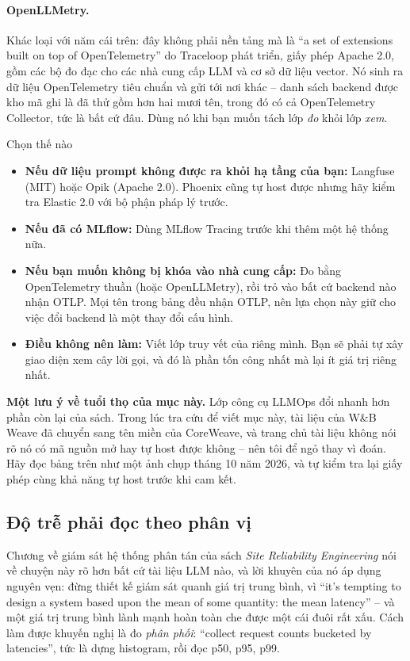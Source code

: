 \paragraph{OpenLLMetry.} Khác loại với năm cái trên: đây không phải nền tảng mà là ``a set of extensions built on top of OpenTelemetry'' do Traceloop phát triển, giấy phép Apache 2.0, gồm các bộ đo đạc cho các nhà cung cấp LLM và cơ sở dữ liệu vector. Nó sinh ra dữ liệu OpenTelemetry tiêu chuẩn và gửi tới nơi khác -- danh sách backend được kho mã ghi là đã thử gồm hơn hai mươi tên, trong đó có cả OpenTelemetry Collector, tức là bất cứ đâu. Dùng nó khi bạn muốn tách lớp \emph{đo} khỏi lớp \emph{xem}.

\begin{assess}{Chọn thế nào}
\begin{itemize}
	\item \textbf{Nếu dữ liệu prompt không được ra khỏi hạ tầng của bạn:} Langfuse (MIT) hoặc Opik (Apache 2.0). Phoenix cũng tự host được nhưng hãy kiểm tra Elastic 2.0 với bộ phận pháp lý trước.
	\item \textbf{Nếu đã có MLflow:} Dùng MLflow Tracing trước khi thêm một hệ thống nữa.
	\item \textbf{Nếu bạn muốn không bị khóa vào nhà cung cấp:} Đo bằng OpenTelemetry thuần (hoặc OpenLLMetry), rồi trỏ vào bất cứ backend nào nhận OTLP. Mọi tên trong bảng đều nhận OTLP, nên lựa chọn này giữ cho việc đổi backend là một thay đổi cấu hình.
	\item \textbf{Điều không nên làm:} Viết lớp truy vết của riêng mình. Bạn sẽ phải tự xây giao diện xem cây lời gọi, và đó là phần tốn công nhất mà lại ít giá trị riêng nhất.
\end{itemize}
\textbf{Một lưu ý về tuổi thọ của mục này.} Lớp công cụ LLMOps đổi nhanh hơn phần còn lại của sách. Trong lúc tra cứu để viết mục này, tài liệu của W\&B Weave đã chuyển sang tên miền của CoreWeave, và trang chủ tài liệu không nói rõ nó có mã nguồn mở hay tự host được không -- nên tôi để ngỏ thay vì đoán. Hãy đọc bảng trên như một ảnh chụp tháng 10 năm 2026, và tự kiểm tra lại giấy phép cùng khả năng tự host trước khi cam kết.
\end{assess}

\subsection{Độ trễ phải đọc theo phân vị}
\label{ssec:latency_percentiles}

Chương về giám sát hệ thống phân tán của sách \textit{Site Reliability Engineering} \cite{beyer2016sre} nói về chuyện này rõ hơn bất cứ tài liệu LLM nào, và lời khuyên của nó áp dụng nguyên vẹn: đừng thiết kế giám sát quanh giá trị trung bình, vì ``it's tempting to design a system based upon the mean of some quantity: the mean latency'' -- và một giá trị trung bình lành mạnh hoàn toàn che được một cái đuôi rất xấu. Cách làm được khuyến nghị là đo \emph{phân phối}: ``collect request counts bucketed by latencies'', tức là dựng histogram, rồi đọc p50, p95, p99.

